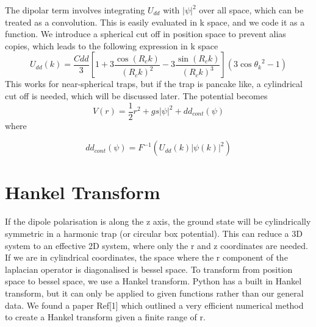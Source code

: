 \documentclass[12pt]{article}
\begin{document}
The dipolar term involves integrating $U_{dd}$ with $|\psi|^{2}$ over all space, which can be treated as a convolution. This is easily evaluated in k space, and we code it as a function. We introduce a spherical cut off in position space to prevent alias copies, which leads to the following expression in k space 
\begin{equation}
U_{dd}(k) = \frac{Cdd}{3}[1+3\frac{\cos(R_{c}k)}{(R_{c}k)^{2}}-3\frac{\sin(R_{c}k)}{(R_{c}k)^{3}}](3\cos{\theta_k}^{2}-1)
\end{equation} 
This works for near-spherical traps, but if the trap is pancake like, a cylindrical cut off is needed, which will be discussed later.
The potential becomes
\begin{equation}
V(r) = \frac{1}{2}r^{2}+gs|\psi|^{2}+dd_{cont}(\psi)
\end{equation}
where 

\begin{equation}
dd_{cont}(\psi) = F^{-1}(U_{dd}(k)|\psi(k)|^{2})
\end{equation}
\section{Hankel Transform}
If the dipole polarisation is along the z axis, the ground state will be cylindrically symmetric in a harmonic trap (or circular box potential). This can reduce a 3D system to an effective 2D system, where only the r and z coordinates are needed. If we are in cylindrical coordinates, the space where the r component of the laplacian operator is diagonalised is bessel space. To transform from position space to bessel space, we use a Hankel transform. Python has a built in Hankel transform, but it can only be applied to given functions rather than our general data. We found a paper Ref[1] which outlined a very efficient numerical method to create a Hankel transform given a finite range of r. 
\end{document}
